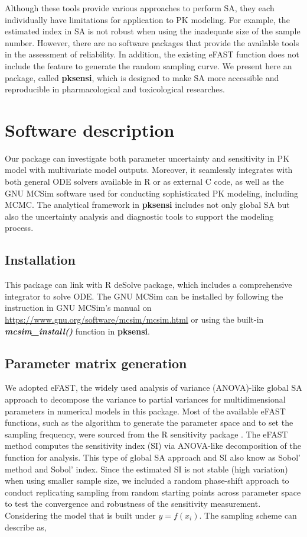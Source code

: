 \documentclass[preprint,12pt, a4paper]{elsarticle}
\begin{document}
Although these tools provide various approaches to perform SA, they each
individually have limitations for application to PK modeling. For
example, the estimated index in SA is not robust when using the
inadequate size of the sample number. However, there are no software
packages that provide the available tools in the assessment of
reliability. In addition, the existing eFAST function does not include
the feature to generate the random sampling curve. We present here an
package, called \textbf{pksensi}, which is designed to make SA more
accessible and reproducible in pharmacological and toxicological
researches. 

\section{Software description}
\label{}

Our package can investigate both parameter uncertainty and
sensitivity in PK model with multivariate model outputs. Moreover, it
seamlessly integrates with both general ODE solvers available in R or as
external C code, as well as the GNU MCSim software used for conducting
sophisticated PK modeling, including MCMC. The analytical framework in
\textbf{pksensi} includes not only global SA but also the uncertainty
analysis and diagnostic tools to support the modeling process.

\subsection{Installation}
\label{installation}

This package can link with R deSolve package,
which includes a comprehensive integrator to solve ODE. The GNU MCSim
can be installed by following the instruction in GNU MCSim's manual on
\url{https://www.gnu.org/software/mcsim/mcsim.html} or using the
built-in \textbf{\textit{mcsim\_install()}} function in \textbf{pksensi}.

\subsection{Parameter matrix generation}
\label{parameter-matrix-generation}

We adopted eFAST, the widely used analysis of variance (ANOVA)-like
global SA approach to decompose the variance to partial variances for
multidimensional parameters in numerical models in this package. Most of
the available eFAST functions, such as the algorithm to generate the
parameter space and to set the sampling frequency, were sourced from the
R sensitivity package \cite{R-sensitivity}. The eFAST method
computes the sensitivity index (SI) via ANOVA-like decomposition of the
function for analysis. This type of global SA approach and SI also know
as Sobol' method and Sobol' index. Since the estimated SI is not stable
(high variation) when using smaller sample size, we included a random
phase-shift approach to conduct replicating sampling from random
starting points across parameter space to test the convergence and
robustness of the sensitivity measurement. Considering the model that is
built under \(y=f(x_{i})\). The sampling scheme can describe as,
\end{document}
